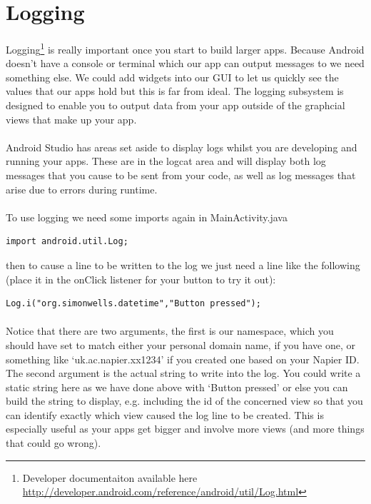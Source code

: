 \section{Logging}
\paragraph{} Logging\footnote{Developer documentaiton available here \url{http://developer.android.com/reference/android/util/Log.html}} is really important once you start to build larger apps. Because Android doesn't have a console or terminal which our app can output messages to we need something else. We could add widgets into our GUI to let us quickly see the values that our apps hold but this is far from ideal. The logging subsystem is designed to enable you to output data from your app outside of the graphcial views that make up your app.

\paragraph{} Android Studio has areas set aside to display logs whilst you are developing and running your apps. These are in the logcat area and will display both log messages that you cause to be sent from your code, as well as log messages that arise due to errors during runtime.

\paragraph{} To use logging we need some imports again in MainActivity.java

\begin{lstlisting}
import android.util.Log;
\end{lstlisting}

then to cause a line to be written to the log we just need a line like the following (place it in the onClick listener for your button to try it out):

\begin{lstlisting}
Log.i("org.simonwells.datetime","Button pressed");
\end{lstlisting}

\paragraph{} Notice that there are two arguments, the first is our namespace, which you should have set to match either your personal domain name, if you have one, or something like `uk.ac.napier.xx1234' if you created one based on your Napier ID. The second argument is the actual string to write into the log. You could write a static string here as we have done above with `Button pressed' or else you can build the string to display, e.g. including the id of the concerned view so that you can identify exactly which view caused the log line to be created. This is especially useful as your apps get bigger and involve more views (and more things that could go wrong).

